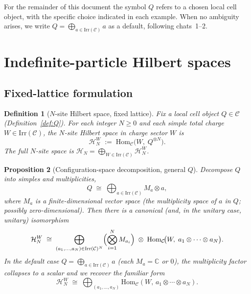 \documentclass[11pt,a4paper]{article}
\newtheorem{definition}{Definition}[section]
\newtheorem{proposition}[definition]{Proposition}
\theoremstyle{definition}
\newcommand{\Cc}{\mathcal{C}}
\newcommand{\Hh}{\mathcal{H}}
\newcommand{\Irr}{\mathrm{Irr}}
\newcommand{\Hom}{\mathrm{Hom}}
\begin{document}
For the remainder of this document the symbol $Q$ refers to a chosen local
cell object, with the specific choice indicated in each example. When no
ambiguity arises, we write $Q = \bigoplus_{a\in\Irr(\Cc)} a$ as a default,
following chats~1--2.

\section{Indefinite-particle Hilbert spaces}

\subsection{Fixed-lattice formulation}

\begin{definition}[$N$-site Hilbert space, fixed lattice]\label{def:Hlatt}
Fix a local cell object $Q\in\Cc$ (Definition~\ref{def:Q}). For each integer
$N\ge 0$ and each simple total charge $W\in\Irr(\Cc)$, the
\emph{$N$-site Hilbert space in charge sector $W$} is
\[
\Hh_N^{W} \;:=\; \Hom_\Cc\!\bigl(W,\;Q^{\otimes N}\bigr).
\]
The full $N$-site space is $\Hh_N = \bigoplus_{W\in\Irr(\Cc)} \Hh_N^{W}$.
\end{definition}

\begin{proposition}[Configuration-space decomposition, general $Q$]\label{prop:conf-decomp}
Decompose $Q$ into simples and multiplicities,
\[
Q \;\cong\; \bigoplus_{a\in\Irr(\Cc)} M_a \otimes a,
\]
where $M_a$ is a finite-dimensional vector space (the
\emph{multiplicity space} of $a$ in $Q$; possibly zero-dimensional).
Then there is a canonical (and, in the unitary case, unitary) isomorphism
\[
\Hh_N^{W} \;\cong\;
\bigoplus_{(a_1,\dots,a_N)\in\Irr(\Cc)^{N}}
\Bigl(\bigotimes_{i=1}^{N} M_{a_i}\Bigr)
\;\otimes\;
\Hom_\Cc\!\bigl(W,\;a_1\otimes\cdots\otimes a_N\bigr).
\]
In the default case $Q = \bigoplus_{a\in\Irr(\Cc)}a$ (each $M_a = \mathbb{C}$
or $0$), the multiplicity factor collapses to a scalar and we recover the
familiar form
\[
\Hh_N^{W} \;\cong\;
\bigoplus_{(a_1,\dots,a_N)}\Hom_\Cc(W,\,a_1\otimes\cdots\otimes a_N).
\]
\end{proposition}
\end{document}
